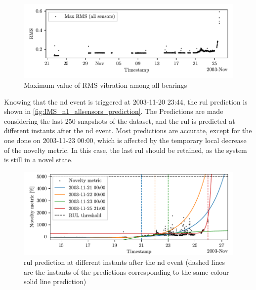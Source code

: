 \begin{figure}
    \centering
    \includegraphics{images/IMS/Novelty_01_RMS_allsensors.pdf}
    \caption{Maximum value of RMS vibration among all bearings}
    \label{fig:IMS_n1_allsensors_RMS}
\end{figure}

Knowing that the \gls{nd} event is triggered at 2003-11-20 23:44, the \gls{rul} prediction is shown in \autoref{fig:IMS_n1_allsensors_prediction}. The Predictions are made considering the last 250 snapshots of the dataset, and the \gls{rul} is predicted at different instants after the \gls{nd} event. Most predictions are accurate, except for the one done on 2003-11-23 00:00, which is affected by the temporary local decrease of the novelty metric. In this case, the last \gls{rul} should be retained, as the system is still in a novel state.

\begin{figure}
    \centering
    \includegraphics[width=\textwidth]{images/IMS/Novelty_01_500samples_allsensors_predictions.pdf}
    \caption{\gls{rul} prediction at different instants after the \gls{nd} event (dashed lines are the instants of the predictions corresponding to the same-colour solid line prediction)}
    \label{fig:IMS_n1_allsensors_prediction}
\end{figure}